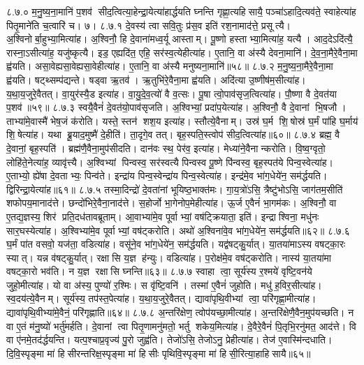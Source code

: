 ८.७.०
म॒नु॒ष्य॒ना॒मानि॑ प॒शव॑ सीद॒त्वित्या॒हेन्द्रा॒येत्या॑हार्द्धयति घ्नन्ति गृह्णा॒त्यहिसायै॒ पञ्चा॑ऽहादि॒त्यव॑ते॒ स्वाहेत्या॑ह पितृ॒माने॑ति च॒त्वारि॑ च। ७।
८.७.१
दे॒वस्य॑ त्वा सवि॒तुः प्र॑स॒व इति॑ रश॒नामाद॑त्ते॒ प्रसूत्यै। अ॒श्विनोर्बा॒हुभ्या॒मित्या॑ह। अ॒श्विनौ॒ हि दे॒वाना॑मध्व॒र्यू आस्ताम्। पू॒ष्णो हस्ताभ्या॒मित्या॑ह॒ यत्यै। आद॒देऽदि॑त्यै॒ रास्ना॒ऽसीत्या॑ह॒ यजु॑ष्कृत्यै। इड॒ एह्यदि॑त॒ एहि॒ सर॑स्व॒त्येहीत्या॑ह। ए॒तानि॒ वा अ॑स्यै देवना॒मानि॑। दे॒व॒ना॒मैरे॒वैना॒मा ह्व॑यति। असा॒वेह्यसा॒वेह्यसा॒वेहीत्या॑ह। ए॒तानि॒ वा अ॑स्यै मनुष्यना॒मानि॑॥५८॥
८.७.२
म॒नु॒ष्य॒ना॒मैरे॒वैना॒मा ह्व॑यति। षट्थ्सम्प॑द्यन्ते। षड्वा ऋ॒तव॑। ऋ॒तुभि॑रे॒वैना॒मा ह्व॑यति। अदि॑त्या उ॒ष्णीष॑म॒सीत्या॑ह। य॒था॒य॒जुरे॒वैतत्। वा॒युर॑स्यै॒ड इत्या॑ह। वा॒यु॒दे॒व॒त्यो॑ वै व॒त्सः। पू॒षा त्वो॒पाव॑सृज॒त्वित्या॑ह। पौ॒ष्णा वै दे॒वत॑या प॒शव॑॥५९॥
८.७.३
स्वयै॒वैनं॑ दे॒वत॑यो॒पाव॑सृजति। अ॒श्विभ्यां॒ प्रदा॑प॒येत्या॑ह। अ॒श्विनौ॒ वै दे॒वानां भि॒षजौ। ताभ्या॑मे॒वास्मै॑ भेष॒जं क॑रोति। यस्ते॒ स्तन॑ शश॒य इत्या॑ह। स्तौत्ये॒वैनाम्। उस्र॑ घ॒र्म शि॒षोस्र॑ घ॒र्मं पा॑हि घ॒र्माय॑ शि॒षेत्या॑ह। यथा ब्रू॒याद॒मुष्मै॑ दे॒हीति॑। ता॒दृगे॒व तत्। बृह॒स्पति॒स्त्वोप॑ सीद॒त्वित्या॑ह॥६०॥
८.७.४
ब्रह्म॒ वै दे॒वानां॒ बृह॒स्पति॑। ब्रह्म॑णै॒वैना॒मुप॑सीदति। दान॑वः स्थ॒ पेर॑व॒ इत्या॑ह। मेध्या॑ने॒वैनान्करोति। वि॒ष्व॒ग्वृतो॒ लोहि॑ते॒नेत्या॑ह॒ व्यावृ॑त्त्यै। अ॒श्विभ्यां पिन्वस्व॒ सर॑स्वत्यै पिन्वस्व पू॒ष्णे पि॑न्वस्व॒ बृह॒स्पत॑ये पिन्व॒स्वेत्या॑ह। ए॒ताभ्यो॒ ह्ये॑षा दे॒वताभ्यः॒ पिन्व॑ते। इन्द्रा॑य पिन्व॒स्वेन्द्रा॑य पिन्व॒स्वेत्या॑ह। इन्द्र॑मे॒व भा॑ग॒धेये॑न॒ सम॑र्द्धयति। द्विरिन्द्रा॒येत्या॑ह॥६१॥
८.७.५
तस्मा॒दिन्द्रो॑ दे॒वता॑नां भूयिष्ठ॒भाक्त॑मः। गा॒य॒त्रो॑ऽसि॒ त्रैष्टु॑भोऽसि॒ जाग॑तम॒सीति॑ शफोपय॒मानाद॑त्ते। छन्दो॑भिरे॒वैना॒नाद॑त्ते। स॒होर्जो भा॒गेनोप॒मेहीत्या॑ह। ऊ॒र्ज ए॒वैनं॑ भा॒गम॑कः। अ॒श्विनौ॒ वा ए॒तद्य॒ज्ञस्य॒ शिर॑ प्रति॒दध॑तावब्रूताम्। आ॒वाभ्या॑मे॒व पूर्वाभ्यां॒ वष॑ट्क्रियाता॒ इति॑। इन्द्राश्विना॒ मधु॑नः सार॒घस्येत्या॑ह। अ॒श्विभ्या॑मे॒व पूर्वाभ्यां॒ वष॑ट्करोति। अथो॑ अ॒श्विना॑वे॒व भा॑ग॒धेये॑न॒ सम॑र्द्धयति॥६२॥
८.७.६
घ॒र्मं पा॑त वसवो॒ यज॑ता॒ वडित्या॑ह। वसू॑ने॒व भा॑ग॒धेये॑न॒ सम॑र्द्धयति। यद्व॑षट्कु॒र्यात्। या॒तया॑माऽस्य वषट्का॒रः स्यात्। यन्न व॑षट्कु॒र्यात्। रक्षासि य॒ज्ञ ह॑न्युः। वडित्या॑ह। प॒रोक्ष॑मे॒व वष॑ट्करोति। नास्य॑ या॒तया॑मा वषट्का॒रो भव॑ति। न य॒ज्ञ रक्षासि घ्नन्ति॥६३॥
८.७.७
स्वाहा त्वा॒ सूर्य॑स्य र॒श्मये॑ वृष्टि॒वन॑ये जुहो॒मीत्या॑ह। यो वा अ॑स्य॒ पुण्यो॑ र॒श्मिः। स वृ॑ष्टि॒वनि॑। तस्मा॑ ए॒वैनं॑ जुहोति। मधु॑ ह॒विर॒सीत्या॑ह। स्व॒दय॑त्ये॒वैनम्। सूर्य॑स्य॒ तप॑स्त॒पेत्या॑ह। य॒था॒य॒जुरे॒वैतत्। द्यावा॑पृथि॒वीभ्यां त्वा॒ परि॑गृह्णा॒मीत्या॑ह। द्यावा॑पृथि॒वीभ्या॑मे॒वैनं॒ परि॑गृह्णाति॥६४॥
८.७.८
अ॒न्तरि॑क्षेण॒ त्वोप॑यच्छा॒मीत्या॑ह। अ॒न्तरि॑क्षेणै॒वैन॒मुप॑यच्छति। न वा ए॒तं म॑नु॒ष्यो॑ भर्तु॑मर्\mbox{}हति। दे॒वानां त्वा पितृ॒णामनु॑मतो॒ भर्तु शकेय॒मित्या॑ह। दे॒वैरे॒वैनं॑ पि॒तृभि॒रनु॑मत॒ आद॑त्ते। वि वा ए॑नमे॒तद॑र्द्धयन्ति। यत्प॒श्चाप्र॒वृज्य॑ पु॒रो जुह्व॑ति। तेजो॑ऽसि॒ तेजोऽनु॒ प्रेहीत्या॑ह। तेज॑ ए॒वास्मि॑न्दधाति। दि॒वि॒स्पृङ्मा मा॑ हिसीरन्तरिक्ष॒स्पृङ्मा मा॑ हिसीः पृथिवि॒स्पृङ्मा मा॑ हिसी॒रित्या॒हाहिसायै॥६५॥
